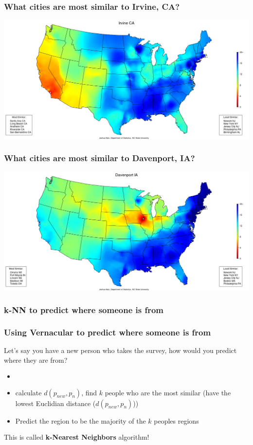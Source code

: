 \documentclass{beamer} %
\newcommand{\1}{\mathbb{1}}
\begin{document}
\begin{frame}[t]\frametitle{What cities are most similar to Irvine, CA?}    
\includegraphics[scale = 0.27]{./visualization/irvine.png}


\end{frame}

\begin{frame}[t]\frametitle{What cities are most similar to Davenport, IA?}    
\includegraphics[scale = 0.27]{./visualization/davenport.png}
\end{frame}


\subsubsection{k-NN to predict where someone is from}

\begin{frame}[t]\frametitle{Using Vernacular to predict where someone is from}    
	Let's say you have a new person who takes the survey, how would you predict where they are from?
	

	\begin{itemize}
		\item[]
		\item calculate $d(p_{new}, p_n)$, find $k$ people who are the most similar (have the lowest Euclidian distance ($d(p_{new}, p_n)$))
		\item Predict the region to be the majority of the $k$ peoples regions
	\end{itemize}
	\vspace{5 mm}

	This is called {\bf{k-Nearest Neighbors}} algorithm!
\end{frame}
\end{document}
